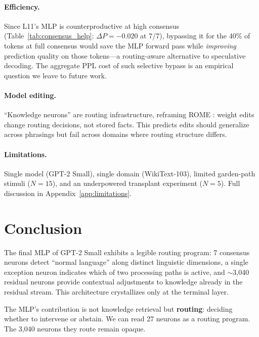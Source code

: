 \documentclass{article}
\begin{document}
\paragraph{Efficiency.}
Since L11's MLP is counterproductive at high consensus
(Table~\ref{tab:consensus_help}: $\Delta P = -0.020$ at 7/7), bypassing it
for the 40\% of tokens at full consensus would save the MLP forward pass
while \emph{improving} prediction quality on those tokens---a routing-aware
alternative to speculative decoding.
The aggregate PPL cost of such selective bypass is an empirical question we
leave to future work.

\paragraph{Model editing.}
``Knowledge neurons'' are routing infrastructure, reframing ROME
\citep{meng2022locating}: weight edits change routing decisions, not stored
facts. This predicts edits should generalize across phrasings but fail across
domains where routing structure differs.

\paragraph{Limitations.}
Single model (GPT-2 Small), single domain (WikiText-103), limited garden-path
stimuli ($N = 15$), and an underpowered transplant experiment ($N = 5$).
Full discussion in Appendix~\ref{app:limitations}.

\section{Conclusion}

The final MLP of GPT-2 Small exhibits a legible routing program:
7 consensus neurons detect ``normal language'' along distinct linguistic
dimensions, a single exception neuron indicates which of two processing paths
is active, and $\sim$3{,}040 residual neurons provide contextual adjustments
to knowledge already in the residual stream.
This architecture crystallizes only at the terminal layer.

The MLP's contribution is not knowledge retrieval but \textbf{routing}:
deciding whether to intervene or abstain.
We can read 27 neurons as a routing program.
The 3{,}040 neurons they route remain opaque.
\end{document}
